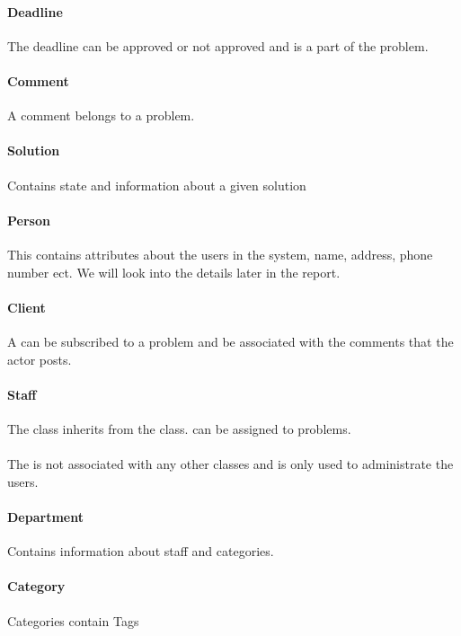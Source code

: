 \paragraph{Deadline} The deadline can be approved or not approved and is a part of the problem. 

\paragraph{Comment} A comment belongs to a problem. 

\paragraph{Solution}
Contains state and information about a given solution

\paragraph{Person}
This contains attributes about the users in the system, name, address, phone number ect. We will look into the details later in the report.

\paragraph{Client} A \aclient[] can be subscribed to a problem and be associated with the comments that the actor \aclient[] posts.  
 
\paragraph{Staff}
The \astaff[] class inherits from the \aclient[] class.
\astaff[] can be assigned to problems. 

\paragraph{\Admin[]} The \admin[] is not associated with any other classes and is only used to administrate the users. 

\paragraph{Department}
Contains information about staff and categories. 

\paragraph{Category} Categories contain Tags


